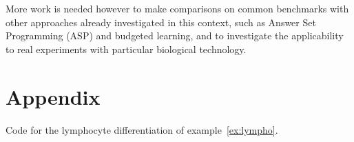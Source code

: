 \documentclass{llncs}
\begin{document}
More work is needed however to make comparisons on common benchmarks
with  other approaches already investigated in this context, such as Answer Set Programming (ASP) and budgeted learning,
and to investigate the applicability to real experiments with particular biological technology.



\newpage
\section*{Appendix}
\begin{listfig}[H]

\caption{Code for the lymphocyte differentiation of example~\ref{ex:lympho}.\label{bool-lympho}}
\end{listfig}
\end{document}
